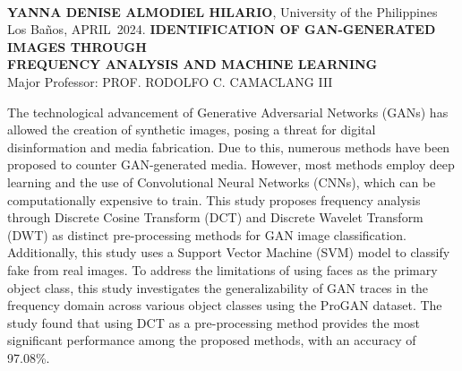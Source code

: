\documentclass{icsthesis}
\renewcommand{\AUTHOR}{YANNA DENISE ALMODIEL HILARIO}
\renewcommand{\MONTH}{APRIL}
\renewcommand{\YEAR}{2024}
\begin{document}
\begin{frontmatter}
		\maketableofcontents
		
		\makelistoftables

		\makelistoffigures
	
		
		\begin{abstractwithpageno}	
		\\
		\textbf{\AUTHOR}, University of the Philippines Los Ba\~{n}os, \MONTH\ \YEAR. \textbf{IDENTIFICATION OF GAN-GENERATED IMAGES THROUGH \\FREQUENCY ANALYSIS AND MACHINE LEARNING}
		\\Major Professor: PROF. RODOLFO C. CAMACLANG III\\
        
        \par The technological advancement of Generative Adversarial Networks (GANs) has allowed the creation of synthetic images, posing a threat for digital disinformation and media fabrication. Due to this, numerous methods have been proposed to counter GAN-generated media. However, most methods employ deep learning and the use of Convolutional Neural Networks (CNNs), which can be computationally expensive to train. This study proposes frequency analysis through Discrete Cosine Transform (DCT) and Discrete Wavelet Transform (DWT) as distinct pre-processing methods for GAN image classification. Additionally, this study uses a Support Vector Machine (SVM) model to classify fake from real images. To address the limitations of using faces as the primary object class, this study investigates the generalizability of GAN traces in the frequency domain across various object classes using the ProGAN dataset. The study found that using DCT as a pre-processing method provides the most significant performance among the proposed methods, with an accuracy of 97.08\%.
		\end{abstractwithpageno}

	\end{frontmatter}
	
\end{document}
